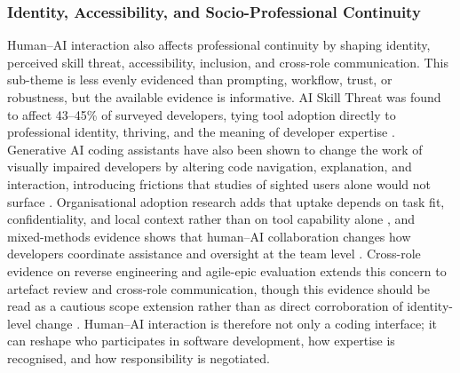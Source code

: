 \subsubsection{Identity, Accessibility, and Socio-Professional Continuity}
\label{sec:hai-identity}
Human--AI interaction also affects professional continuity by shaping identity, perceived skill threat, accessibility, inclusion, and cross-role communication. This sub-theme is less evenly evidenced than prompting, workflow, trust, or robustness, but the available evidence is informative. AI Skill Threat was found to affect 43--45\% of surveyed developers, tying tool adoption directly to professional identity, thriving, and the meaning of developer expertise \cite{hicks_new_2024}. Generative AI coding assistants have also been shown to change the work of visually impaired developers by altering code navigation, explanation, and interaction, introducing frictions that studies of sighted users alone would not surface \cite{flores-saviaga_impact_2025}. Organisational adoption research adds that uptake depends on task fit, confidentiality, and local context rather than on tool capability alone \cite{davila_industry_2024}, and mixed-methods evidence shows that human--AI collaboration changes how developers coordinate assistance and oversight at the team level \cite{stray_human-ai_2025}. Cross-role evidence on reverse engineering and agile-epic evaluation extends this concern to artefact review and cross-role communication, though this evidence should be read as a cautious scope extension rather than as direct corroboration of identity-level change \cite{surk_reducing_2026}. Human--AI interaction is therefore not only a coding interface; it can reshape who participates in software development, how expertise is recognised, and how responsibility is negotiated.

